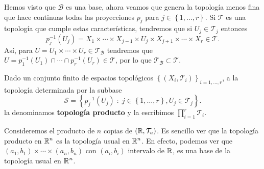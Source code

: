 Hemos visto que $\displaystyle \mathcal{B} $ es una base, ahora veamos que genera la topología menos fina que hace continuas todas las proyecciones $\displaystyle p_{j} $ para $\displaystyle j \in \left\{ 1, \ldots, r\right\}  $. Si $\displaystyle \mathcal{T} $ es una topología que cumple estas características, tendremos que si $\displaystyle U_{j} \in \mathcal{T}_{j} $ entonces
\[p_{j}^{-1}\left(U_{j}\right)= X_{1} \times \cdots \times X_{j-1} \times U_{j} \times X_{j+1} \times \cdots \times X_{r} \in \mathcal{T} .\]
Así, para $\displaystyle U = U_{1} \times \cdots \times U_{r} \in \mathcal{T}_{\mathcal{B}}$ tendremos que $\displaystyle U = p^{-1}_{1}\left(U_{1}\right) \cap \cdots \cap p^{-1}_{r}\left(U_{r}\right) \in \mathcal{T} $, por lo que $\displaystyle \mathcal{T}_{\mathcal{B}}\subset \mathcal{T} $.  
\begin{definition}
	Dado un conjunto finito de espacios topológicos $\displaystyle \left\{ \left(X_{i}, \mathcal{T}_{i}\right)\right\} _{i = 1, \ldots, r} $, a la topología determinada por la subbase 
	\[\mathcal{S}= \left\{ p_{j}^{-1}\left(U_{j}\right) \; : \; j \in \left\{ 1, \ldots, r\right\} , U_{j}\in \mathcal{T}_{j}\right\} .\]
	la denominamos \textbf{topología producto} y la escribimos $\displaystyle \prod^{r}_{i = 1}\mathcal{T}_{i} $. 
\end{definition}
 
\begin{eg}
Consideremos el producto de $\displaystyle n $ copias de $\displaystyle \left(\mathbb{R}, \mathcal{T}_{u}\right) $. Es sencillo ver que la topología producto en $\displaystyle \mathbb{R}^{n} $ es la topología usual en $\displaystyle \mathbb{R}^{n} $. En efecto, podemos ver que $\displaystyle \left(a_{1}, b_{1}\right)\times \cdots \times\left(a_{n}, b_{n}\right) $ con $\displaystyle \left(a_{i}, b_{i}\right) $ intervalo de $\displaystyle \mathbb{R} $, es una base de la topología usual en $\displaystyle \mathbb{R}^{n} $. 
\end{eg}


